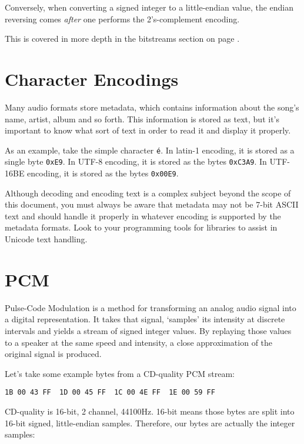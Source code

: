 Conversely, when converting a signed integer to a little-endian value,
the endian reversing comes \textit{after} one performs the
2's-complement encoding.

This is covered in more depth in the bitstreams section
on page \pageref{bitstreams}.

\section{Character Encodings}

Many audio formats store metadata, which contains information about
the song's name, artist, album and so forth.
This information is stored as text, but it's important to know what
sort of text in order to read it and display it properly.

As an example, take the simple character \texttt{\'e}.
In latin-1 encoding, it is stored as a single byte \texttt{0xE9}.
In UTF-8 encoding, it is stored as the bytes \texttt{0xC3A9}.
In UTF-16BE encoding, it is stored as the bytes \texttt{0x00E9}.

Although decoding and encoding text is a complex subject beyond
the scope of this document, you must always be aware that
metadata may not be 7-bit ASCII text and should handle
it properly in whatever encoding is supported by the metadata
formats.
Look to your programming tools for libraries to assist in Unicode
text handling.

\pagebreak

\section {PCM}

Pulse-Code Modulation is a method for transforming an analog
audio signal into a digital representation.
It takes that signal, `samples' its intensity at
discrete intervals and yields a stream of signed integer
values.
By replaying those values to a speaker at the same
speed and intensity, a close approximation of the
original signal is produced.

Let's take some example bytes from a CD-quality PCM stream:

\begin{Verbatim}[frame=single]
1B 00 43 FF  1D 00 45 FF  1C 00 4E FF  1E 00 59 FF
\end{Verbatim}

CD-quality is 16-bit, 2 channel, 44100Hz.
16-bit means those bytes are split into 16-bit signed, little-endian samples.
Therefore, our bytes are actually the integer samples:

